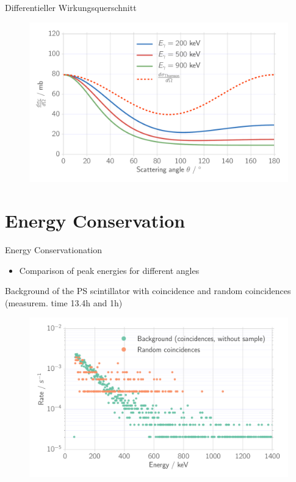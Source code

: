 \documentclass[xcolor=x11names,compress]{beamer}
\renewcommand{\(}{\begin{columns}}
\renewcommand{\)}{\end{columns}}
\newcommand{\<}[1]{\begin{column}{#1}}
\renewcommand{\>}{\end{column}}
\begin{document}
\begin{frame}[t]{Differentieller Wirkungsquerschnitt}
\begin{figure}[htpb]
    \centering
    \includegraphics[width=1.0\linewidth]{../analysis/figures/theory_diff_cs}
\label{fig:theory_diff}
\end{figure}
\end{frame}

\section{Energy Conservation}
\begin{frame}[t]{Energy Conservationation}
    \begin{itemize}
        \item Comparison of peak energies for different angles
    \end{itemize}
\end{frame}
\begin{frame}[t]{Background of the PS scintillator with coincidence
    and random coincidences (measurem. time 13.4h and 1h)}
    \begin{figure}[htpb]
    \centering
    \includegraphics[width=1.0\linewidth]{../analysis/figures/coin_background_random}
    \label{fig:coin_ps_background}
\end{figure}

\end{frame}
\end{document}
